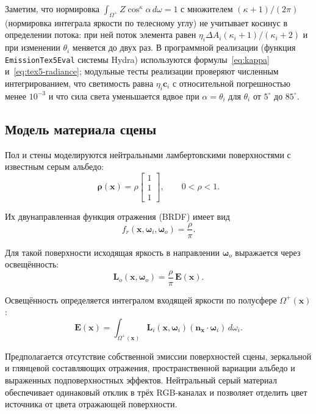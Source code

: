 Заметим, что нормировка $\int_{\Omega^+}Z\cos^{\kappa}\alpha\,d\omega=1$ с множителем $(\kappa+1)/(2\pi)$ (нормировка интеграла яркости по телесному углу) не учитывает косинус в определении потока: при ней поток элемента равен $\eta_i\Delta A_i(\kappa_i+1)/(\kappa_i+2)$ и при изменении $\theta_i$ меняется до двух раз. В программной реализации (функция \texttt{EmissionTex5Eval} системы Hydra) используются формулы~\eqref{eq:kappa} и~\eqref{eq:tex5-radiance}; модульные тесты реализации проверяют численным интегрированием, что светимость равна $\eta_i\mathbf{c}_i$ с относительной погрешностью менее $10^{-3}$ и что сила света уменьшается вдвое при $\alpha=\theta_i$ для $\theta_i$ от $5^\circ$ до $85^\circ$.

\subsection{Модель материала сцены}

Пол и стены моделируются нейтральными ламбертовскими поверхностями с известным серым альбедо:
\begin{equation}
\boldsymbol{\rho}(\mathbf{x})
=
\rho
\begin{bmatrix}
1\\
1\\
1
\end{bmatrix},
\qquad
0<\rho<1.
\end{equation}

Их двунаправленная функция отражения (BRDF) имеет вид
\begin{equation}
f_r(\mathbf{x},\boldsymbol{\omega}_i,\boldsymbol{\omega}_o)
=
\frac{\rho}{\pi}.
\end{equation}

Для такой поверхности исходящая яркость в направлении $\boldsymbol{\omega}_o$ выражается через освещённость:
\begin{equation}
\mathbf{L}_o(\mathbf{x},\boldsymbol{\omega}_o)
=
\frac{\rho}{\pi}\,\mathbf{E}(\mathbf{x}).
\end{equation}

Освещённость определяется интегралом входящей яркости по полусфере $\Omega^+(\mathbf{x})$:
\begin{equation}
\mathbf{E}(\mathbf{x})
=
\int_{\Omega^+(\mathbf{x})}
\mathbf{L}_i(\mathbf{x},\boldsymbol{\omega}_i)
\left(\mathbf{n}_{\mathbf{x}}\cdot\boldsymbol{\omega}_i\right)
\,d\omega_i.
\end{equation}

Предполагается отсутствие собственной эмиссии поверхностей сцены, зеркальной и глянцевой составляющих отражения, пространственной вариации альбедо и выраженных подповерхностных эффектов. Нейтральный серый материал обеспечивает одинаковый отклик в трёх RGB-каналах и позволяет отделить цвет источника от цвета отражающей поверхности.

